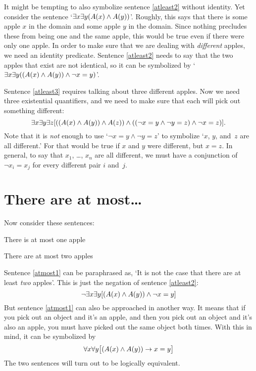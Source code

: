 It might be tempting to also symbolize sentence \ref{atleast2} without identity. Yet consider the sentence `$\exists x \exists y(\mathord{A}(x) \wedge \mathord{A}(y))$'. Roughly, this says that there is some apple $x$ in the domain and some apple $y$ in the domain. Since nothing precludes these from being one and the same apple, this would be true even if there were only one apple. In order to make sure that we are dealing with \emph{different} apples, we need an identity predicate. Sentence \ref{atleast2} needs to say that the two apples that exist are not identical, so it can be symbolized by `$\exists x \exists y((\mathord{A}(x) \wedge \mathord{A}(y)) \wedge \neg x = y)$'.

Sentence \ref{atleast3} requires talking about three different apples. Now we need three existential quantifiers, and we need to make sure that each will pick out something different: 
\[
	\exists x \exists y\exists z[((\mathord{A}(x) \wedge \mathord{A}(y)) \wedge \mathord{A}(z)) \wedge ((\neg x = y \wedge \neg y = z) \wedge \neg x = z)].
\]
Note that it is \emph{not} enough to use `$\lnot x = y \land \lnot y = z$' to symbolize `$x$, $y$, and~$z$ are all different.' For that would be true if $x$ and $y$ were different, but $x = z$. In general, to say that $x_1$, \dots, $x_n$ are all different, we must have a conjunction of $\lnot x_i = x_j$ for every different pair $i$ and~$j$.

\section{There are at most\ldots}
Now consider these sentences:
\begin{earg}
	\item[\ex{atmost1}] There is at most one apple
	\item[\ex{atmost2}] There are at most two apples
\end{earg}
Sentence \ref{atmost1} can be paraphrased as, `It is not the case that there are at least \emph{two} apples'. This is just the negation of sentence \ref{atleast2}: 
$$\neg \exists x \exists y[(\mathord{A}(x) \wedge \mathord{A}(y)) \wedge \neg x = y]$$
But sentence \ref{atmost1} can also be approached in another way. It means that if you pick out an object and it's an apple, and then you pick out an object and it's also an apple, you must have picked out the same object both times. With this in mind, it can be symbolized by
$$\forall x\forall y\bigl[(\mathord{A}(x) \wedge \mathord{A}(y)) \rightarrow x=y\bigr]$$
The two sentences will turn out to be logically equivalent.

